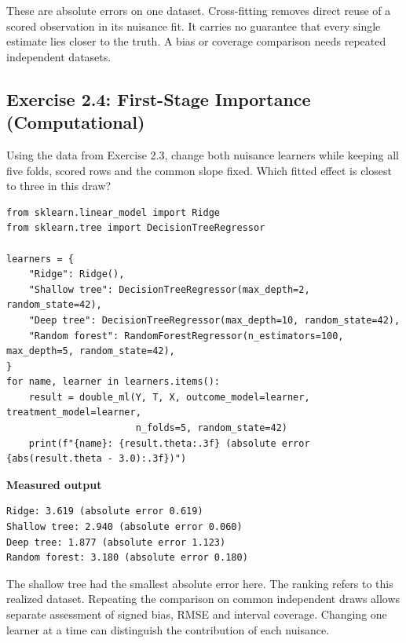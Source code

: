These are absolute errors on one dataset. Cross-fitting removes direct reuse of a scored observation in its nuisance fit. It carries no guarantee that every single estimate lies closer to the truth. A bias or coverage comparison needs repeated independent datasets.

\subsection{Exercise 2.4: First-Stage Importance
(Computational)}\label{_exercise_2_4_first_stage_importance_computational}

Using the data from Exercise 2.3, change both nuisance learners while keeping all five folds, scored rows and the common slope fixed. Which fitted effect is closest to three in this draw?

\begin{verbatim}
from sklearn.linear_model import Ridge
from sklearn.tree import DecisionTreeRegressor

learners = {
    "Ridge": Ridge(),
    "Shallow tree": DecisionTreeRegressor(max_depth=2, random_state=42),
    "Deep tree": DecisionTreeRegressor(max_depth=10, random_state=42),
    "Random forest": RandomForestRegressor(n_estimators=100, max_depth=5, random_state=42),
}
for name, learner in learners.items():
    result = double_ml(Y, T, X, outcome_model=learner, treatment_model=learner,
                       n_folds=5, random_state=42)
    print(f"{name}: {result.theta:.3f} (absolute error {abs(result.theta - 3.0):.3f})")
\end{verbatim}

\textbf{Measured output}

\begin{verbatim}
Ridge: 3.619 (absolute error 0.619)
Shallow tree: 2.940 (absolute error 0.060)
Deep tree: 1.877 (absolute error 1.123)
Random forest: 3.180 (absolute error 0.180)
\end{verbatim}

The shallow tree had the smallest absolute error here. The ranking refers to this realized dataset. Repeating the comparison on common independent draws allows separate assessment of signed bias, RMSE and interval coverage. Changing one learner at a time can distinguish the contribution of each nuisance.


